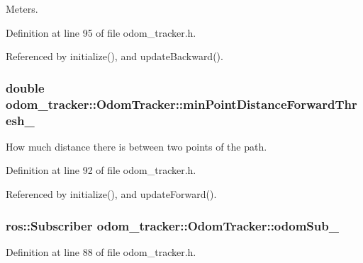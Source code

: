 Meters. 



Definition at line 95 of file odom\+\_\+tracker.\+h.



Referenced by initialize(), and update\+Backward().

\subsubsection[{\texorpdfstring{min\+Point\+Distance\+Forward\+Thresh\+\_\+}{minPointDistanceForwardThresh_}}]{\setlength{\rightskip}{0pt plus 5cm}double odom\+\_\+tracker\+::\+Odom\+Tracker\+::min\+Point\+Distance\+Forward\+Thresh\+\_\+\hspace{0.3cm}{\ttfamily [protected]}}\hypertarget{classodom__tracker_1_1OdomTracker_adda207eec9e5a5999e1e97e6f2876377}{}\label{classodom__tracker_1_1OdomTracker_adda207eec9e5a5999e1e97e6f2876377}


How much distance there is between two points of the path. 



Definition at line 92 of file odom\+\_\+tracker.\+h.



Referenced by initialize(), and update\+Forward().

\subsubsection[{\texorpdfstring{odom\+Sub\+\_\+}{odomSub_}}]{\setlength{\rightskip}{0pt plus 5cm}ros\+::\+Subscriber odom\+\_\+tracker\+::\+Odom\+Tracker\+::odom\+Sub\+\_\+\hspace{0.3cm}{\ttfamily [protected]}}\hypertarget{classodom__tracker_1_1OdomTracker_a186753d1ad08b52714312a124d62029f}{}\label{classodom__tracker_1_1OdomTracker_a186753d1ad08b52714312a124d62029f}


Definition at line 88 of file odom\+\_\+tracker.\+h.



